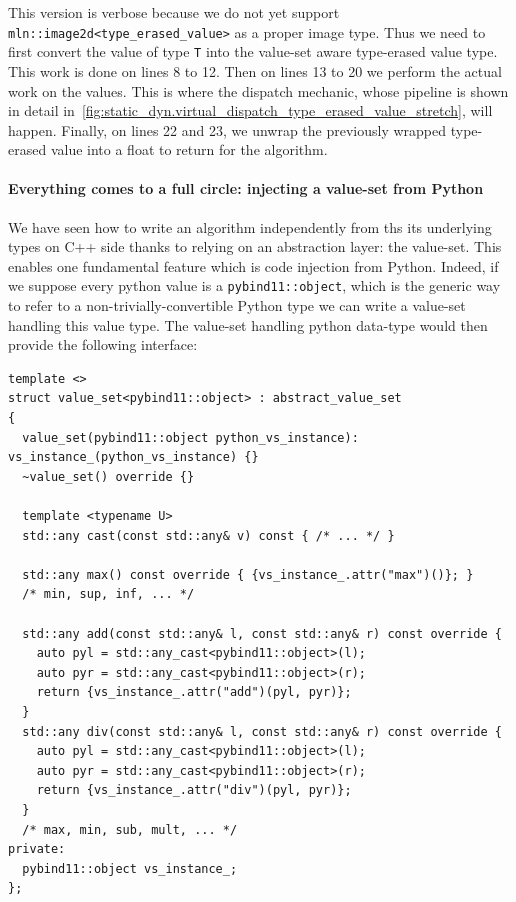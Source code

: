 This version is verbose because we do not yet support \texttt{mln::image2d<type\_erased\_value>} as a proper image type.
Thus we need to first convert the value of type \texttt{T} into the value-set aware type-erased value type. This work is
done on lines 8 to 12. Then on lines 13 to 20 we perform the actual work on the values. This is where the dispatch
mechanic, whose pipeline is shown in detail in~\cref{fig:static_dyn.virtual_dispatch_type_erased_value_stretch}, will
happen. Finally, on lines 22 and 23, we unwrap the previously wrapped type-erased value into a float to return for the
algorithm.


\paragraph{Everything comes to a full circle: injecting a value-set from Python}

We have seen how to write an algorithm independently from ths its underlying types on C++ side thanks to relying on an
abstraction layer: the value-set. This enables one fundamental feature which is code injection from Python. Indeed, if
we suppose every python value is a \texttt{pybind11::object}, which is the generic way to refer to a
non-trivially-convertible Python type we can write a value-set handling this value type. The value-set handling python
data-type would then provide the following interface:

\begin{verbatim}
template <>
struct value_set<pybind11::object> : abstract_value_set
{
  value_set(pybind11::object python_vs_instance): vs_instance_(python_vs_instance) {}
  ~value_set() override {}

  template <typename U>
  std::any cast(const std::any& v) const { /* ... */ }

  std::any max() const override { {vs_instance_.attr("max")()}; }
  /* min, sup, inf, ... */

  std::any add(const std::any& l, const std::any& r) const override {
    auto pyl = std::any_cast<pybind11::object>(l);
    auto pyr = std::any_cast<pybind11::object>(r);
    return {vs_instance_.attr("add")(pyl, pyr)};
  }
  std::any div(const std::any& l, const std::any& r) const override {
    auto pyl = std::any_cast<pybind11::object>(l);
    auto pyr = std::any_cast<pybind11::object>(r);
    return {vs_instance_.attr("div")(pyl, pyr)};
  }
  /* max, min, sub, mult, ... */
private:
  pybind11::object vs_instance_;
};
\end{verbatim}

